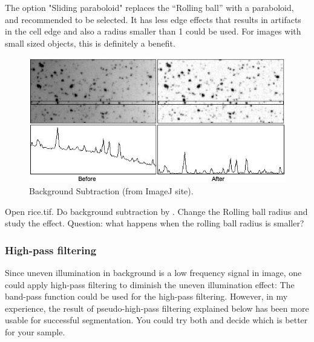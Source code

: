The option "Sliding paraboloid" replaces the ``Rolling ball'' with a paraboloid, and recommended to be selected. It has less edge effects that results in artifacts in the cell edge and also a radius smaller than 1 could be used. For images with small sized objects, this is definitely a benefit. 

\begin{figure}[htbp]
\begin{center}
\includegraphics[width=11.875cm]{fig/CMCIBasicCourse201102-img69.jpg}
\caption{ Background Subtraction (from ImageJ site).}
\label{fig:img69}
\end{center}
\end{figure}


\begin{indentexercise}{1}
Open rice.tif. Do background
subtraction by .
Change the Rolling ball radius and study the effect. Question: what
happens when the rolling ball radius is smaller?
\end{indentexercise}

\subsubsection{High-pass filtering}
 
Since uneven illumination in background is a low frequency signal in image, one could apply high-pass filtering to diminish the uneven illumination effect: The band-pass function  could be used for the high-pass filtering. However, in my experience, the result of pseudo-high-pass filtering explained below has been more usable for successful segmentation. You could try both and decide which is better for your sample.  

